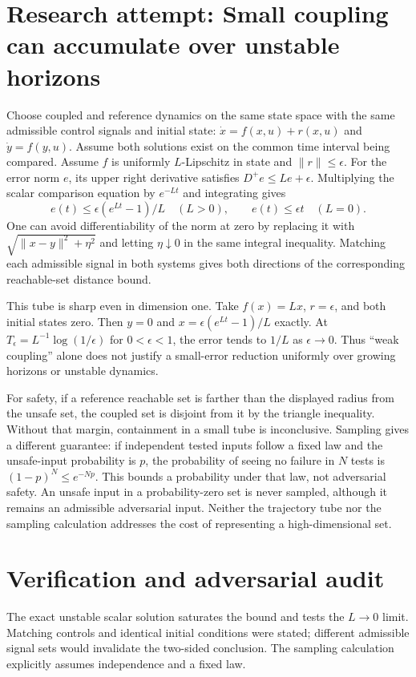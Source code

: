 \documentclass[11pt]{article}
\begin{document}
\section{Research attempt: Small coupling can accumulate over unstable horizons}
Choose coupled and reference dynamics on the same state space with the
same admissible control signals and initial state:
$\dot x=f(x,u)+r(x,u)$ and $\dot y=f(y,u)$.
Assume both solutions exist on the common time interval being compared.
Assume $f$ is uniformly $L$-Lipschitz in state and $\|r\|\le\epsilon$.
For the error norm $e$, its upper right derivative satisfies
$D^+e\le Le+\epsilon$. Multiplying the scalar comparison equation by
$e^{-Lt}$ and integrating gives
\[
 e(t)\le\epsilon(e^{Lt}-1)/L\quad(L>0),\qquad e(t)\le\epsilon t\quad(L=0).
\]
One can avoid differentiability of the norm at zero by replacing it with
$\sqrt{\|x-y\|^2+\eta^2}$ and letting $\eta\downarrow0$ in the same integral
inequality. Matching each admissible signal in both systems gives both
directions of the corresponding reachable-set distance bound.

This tube is sharp even in dimension one. Take $f(x)=Lx$, $r=\epsilon$,
and both initial states zero. Then $y=0$ and
$x=\epsilon(e^{Lt}-1)/L$ exactly. At
$T_\epsilon=L^{-1}\log(1/\epsilon)$ for $0<\epsilon<1$, the error tends to
$1/L$ as $\epsilon\to0$. Thus ``weak coupling'' alone does not justify a
small-error reduction uniformly over growing horizons or unstable dynamics.

For safety, if a reference reachable set is farther than the displayed radius
from the unsafe set, the coupled set is disjoint from it by the triangle
inequality. Without that margin, containment in a small tube is inconclusive.
Sampling gives a different guarantee: if independent tested inputs follow a
fixed law and the unsafe-input probability is $p$, the probability of seeing
no failure in $N$ tests is $(1-p)^N\le e^{-Np}$. This bounds a probability
under that law, not adversarial safety. An unsafe input in a probability-zero
set is never sampled, although it remains an admissible adversarial input.
Neither the trajectory tube nor the sampling calculation addresses the
cost of representing a high-dimensional set.
\section{Verification and adversarial audit}
The exact unstable scalar solution saturates the bound and tests the
$L\to0$ limit. Matching controls and identical initial conditions were stated;
different admissible signal sets would invalidate the two-sided conclusion.
The sampling calculation explicitly assumes independence and a fixed law.
\end{document}
